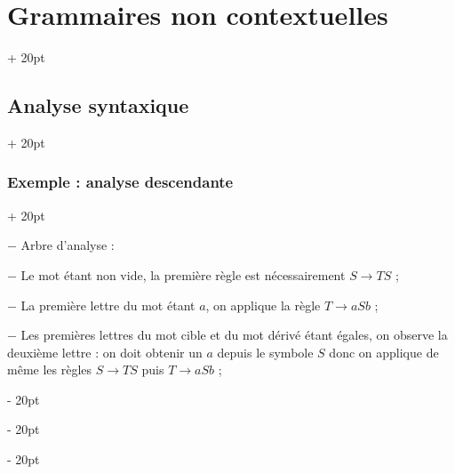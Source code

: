 \documentclass[a4paper, 12pt, twoside]{article}
\newcommand{\ind}[1][20pt]{\advance\leftskip + #1}
\newcommand{\deind}[1][20pt]{\advance\leftskip - #1}
\newenvironment{indt}[2][20pt]{#2 \par \ind[#1]}{\par \deind} %
\begin{document}
\begin{indt}{\section{Grammaires non contextuelles}}
\begin{indt}{\subsection{Analyse syntaxique}}
\begin{indt}{\subsubsection{Exemple : analyse descendante}}
                \vspace{6pt}
                
                $-$ Arbre d'analyse :

                \begin{center}
                \end{center}
                
                \vspace{6pt}
                
                $-$ Le mot étant non vide, la première règle est nécessairement $S \rightarrow TS$ ;

                $-$ La première lettre du mot étant $a$, on applique la règle $T \rightarrow aSb$ ;

                $-$ Les premières lettres du mot cible et du mot dérivé étant égales, on observe la deuxième lettre : on doit obtenir  un $a$ depuis le symbole $S$ donc on applique de même les règles $S \rightarrow TS$ puis $T \rightarrow aSb$ ;


\end{indt}
\end{indt}
\end{indt}
\end{document}
